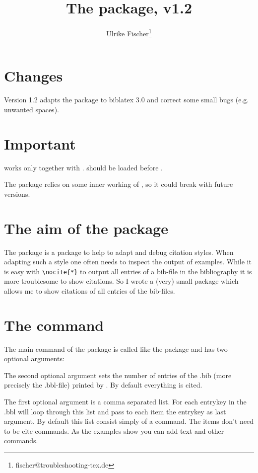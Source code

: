 \documentclass[DIV=12]{scrartcl}
\title{The \pkg{citeall} package, v1.2}
\author{Ulrike Fischer\thanks{fischer@troubleshooting-tex.de}}
\begin{document}
\maketitle
\section{Changes}

Version 1.2 adapts the package to biblatex 3.0 and correct some small bugs (e.g. unwanted spaces).
\section{Important}
 works only together with .   should be loaded before .

The package relies on some inner working of , so it could break with future versions.

\section{The aim of the package}
The  package is a package to help to adapt and debug 
citation styles. When adapting such a style one often needs to inspect the
output of examples. While it is easy with \verb+\nocite{*}+ to output all entries of a bib-file in the bibliography it is more troublesome to show citations.
So I wrote a (very) small package which allows me to show citations of all entries of the bib-files.




\section{The command}
The main command of the package is called like the package and has two optional arguments:

\DescribeMacro{}

The second optional argument sets the number of entries of the .bib (more precisely the .bbl-file) printed by . By default everything is cited.

The first optional argument is a comma separated list.
For each entrykey in the .bbl  will loop through this list and pass to each item the entrykey as last argument. By default this list consist simply of a  command.  The items don't need to be cite commands. As the examples show you can add text and other commands.
\end{document}
